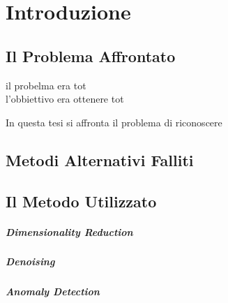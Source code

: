 
\chapter{Introduzione}

\section{Il Problema Affrontato}
il probelma era tot \\
l'obbiettivo era ottenere tot

In questa tesi si affronta il problema di riconoscere 



\section{Metodi Alternativi Falliti}




\section{Il Metodo Utilizzato}

\paragraph{Dimensionality Reduction}

\paragraph{Denoising}

\paragraph{Anomaly Detection}


